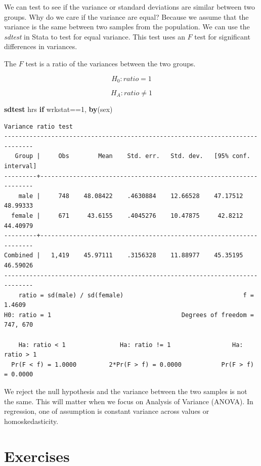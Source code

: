 \documentclass[
]{book}
\newenvironment{Shaded}{\begin{snugshade}}{\end{snugshade}}
\newcommand{\KeywordTok}[1]{\textcolor[rgb]{0.13,0.29,0.53}{\textbf{#1}}}
\newcommand{\NormalTok}[1]{#1}
\begin{document}
We can test to see if the variance or standard deviations are similar between two groups. Why do we care if the variance are equal? Because we assume that the variance is the same between two samples from the population. We can use the \emph{sdtest} in Stata to test for equal variance. This test uses an \(F\) test for significant differences in variances.

The \(F\) test is a ratio of the variances between the two groups.

\[ H_0: ratio=1 \]

\[ H_A: ratio \neq 1 \]

\begin{Shaded}
\begin{Highlighting}[]
\KeywordTok{sdtest}\NormalTok{ hrs }\KeywordTok{if}\NormalTok{ wrkstat==1, }\KeywordTok{by}\NormalTok{(sex)}
\end{Highlighting}
\end{Shaded}

\begin{verbatim}
Variance ratio test
------------------------------------------------------------------------------
   Group |     Obs        Mean    Std. err.   Std. dev.   [95% conf. interval]
---------+--------------------------------------------------------------------
    male |     748    48.08422    .4630884    12.66528    47.17512    48.99333
  female |     671     43.6155    .4045276    10.47875     42.8212    44.40979
---------+--------------------------------------------------------------------
Combined |   1,419    45.97111    .3156328    11.88977    45.35195    46.59026
------------------------------------------------------------------------------
    ratio = sd(male) / sd(female)                                 f =   1.4609
H0: ratio = 1                                    Degrees of freedom = 747, 670

    Ha: ratio < 1               Ha: ratio != 1                 Ha: ratio > 1
  Pr(F < f) = 1.0000         2*Pr(F > f) = 0.0000           Pr(F > f) = 0.0000
\end{verbatim}

We reject the null hypothesis and the variance between the two samples is not the same. This will matter when we focus on Analysis of Variance (ANOVA). In regression, one of assumption is constant variance across values or homoskedasticity.

\chapter{Exercises}\label{exercises}
\end{document}
